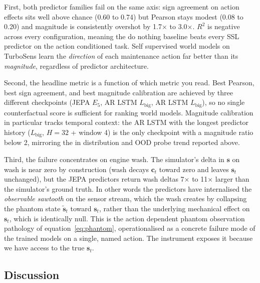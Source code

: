 \documentclass{article}
\begin{document}
First, both predictor families fail on the same axis: sign agreement on
action effects sits well above chance (0.60 to 0.74) but Pearson stays
modest (0.08 to 0.20) and magnitude is consistently overshot by
1.7$\times$ to 3.0$\times$. $R^2$ is negative across every
configuration, meaning the do nothing baseline beats every SSL
predictor on the action conditioned task. Self supervised world models
on TurboSens learn the \emph{direction} of each maintenance action far
better than its \emph{magnitude}, regardless of predictor architecture.

Second, the headline metric is a function of which metric you read.
Best Pearson, best sign agreement, and best magnitude calibration are
achieved by three different checkpoints (JEPA $E_5$, AR LSTM
$L_\mathrm{big}$, AR LSTM $L_\mathrm{big}$), so no single counterfactual
score is sufficient for ranking world models. Magnitude calibration in
particular tracks temporal context: the AR LSTM with the longest
predictor history ($L_\mathrm{big}$, $H{=}32$ + window 4) is the only
checkpoint with a magnitude ratio below 2, mirroring the in
distribution and OOD probe trend reported above.

Third, the failure concentrates on engine wash. The simulator's
delta in $\mathbf{s}$ on wash is near zero by construction (wash decays $\mathbf{c}_t$
toward zero and leaves $\mathbf{s}_t$ unchanged), but the JEPA
predictors return wash deltas 7$\times$ to 11$\times$ larger than the
simulator's ground truth. In other words the predictors have
internalised the \emph{observable sawtooth} on the sensor stream,
which the wash creates by collapsing the phantom state $\tilde{\mathbf{s}}_t$
toward $\mathbf{s}_t$, rather than the underlying mechanical effect on
$\mathbf{s}_t$, which is identically null. This is the action dependent
phantom observation pathology of equation~\ref{eq:phantom},
operationalised as a concrete failure mode of the trained models on a
single, named action. The instrument exposes it because we have access
to the true $\mathbf{s}_t$.

\subsection{Discussion}
\label{sec:discussion}
\end{document}
